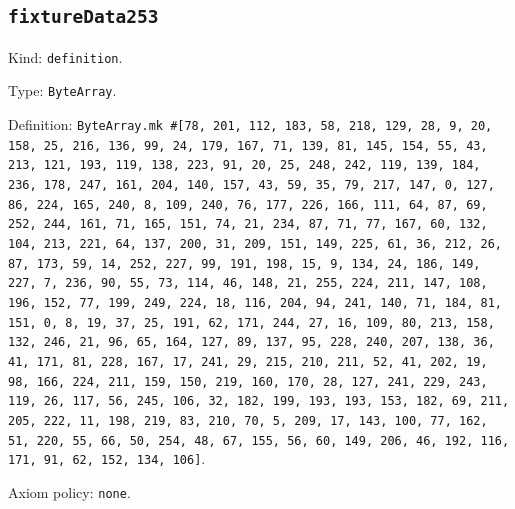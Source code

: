 \documentclass[11pt]{article}
\begin{document}
\subsection*{\texttt{fixtureData253}}
\noindent Kind: \texttt{definition}.\par
\noindent Type: \texttt{ByteArray}.\par
\noindent Definition: \texttt{ByteArray.mk \#[78, 201, 112, 183, 58, 218, 129, 28, 9, 20, 158, 25, 216, 136, 99, 24, 179, 167, 71, 139, 81, 145, 154, 55, 43, 213, 121, 193, 119, 138, 223, 91, 20, 25, 248, 242, 119, 139, 184, 236, 178, 247, 161, 204, 140, 157, 43, 59, 35, 79, 217, 147, 0, 127, 86, 224, 165, 240, 8, 109, 240, 76, 177, 226, 166, 111, 64, 87, 69, 252, 244, 161, 71, 165, 151, 74, 21, 234, 87, 71, 77, 167, 60, 132, 104, 213, 221, 64, 137, 200, 31, 209, 151, 149, 225, 61, 36, 212, 26, 87, 173, 59, 14, 252, 227, 99, 191, 198, 15, 9, 134, 24, 186, 149, 227, 7, 236, 90, 55, 73, 114, 46, 148, 21, 255, 224, 211, 147, 108, 196, 152, 77, 199, 249, 224, 18, 116, 204, 94, 241, 140, 71, 184, 81, 151, 0, 8, 19, 37, 25, 191, 62, 171, 244, 27, 16, 109, 80, 213, 158, 132, 246, 21, 96, 65, 164, 127, 89, 137, 95, 228, 240, 207, 138, 36, 41, 171, 81, 228, 167, 17, 241, 29, 215, 210, 211, 52, 41, 202, 19, 98, 166, 224, 211, 159, 150, 219, 160, 170, 28, 127, 241, 229, 243, 119, 26, 117, 56, 245, 106, 32, 182, 199, 193, 193, 153, 182, 69, 211, 205, 222, 11, 198, 219, 83, 210, 70, 5, 209, 17, 143, 100, 77, 162, 51, 220, 55, 66, 50, 254, 48, 67, 155, 56, 60, 149, 206, 46, 192, 116, 171, 91, 62, 152, 134, 106]}.\par
\noindent Axiom policy: \texttt{none}.\par
\end{document}
